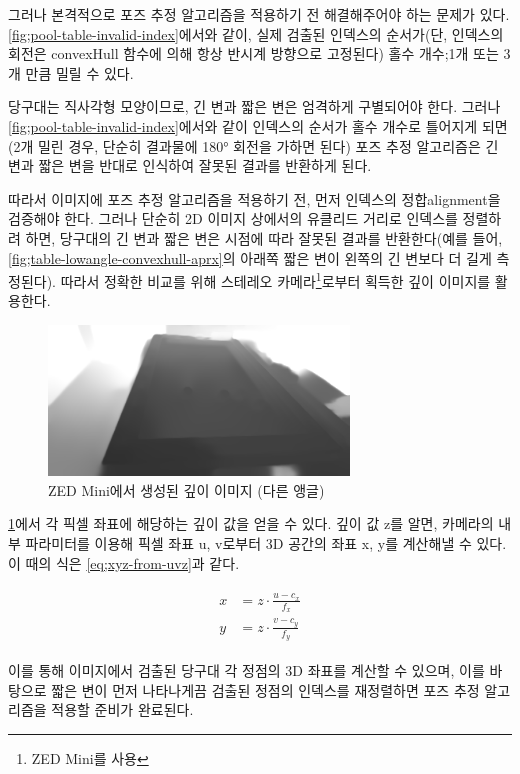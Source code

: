 \documentclass[10pt]{oblivoir}
\newcommand{\textss}[1]{\scriptsize#1\normalsize}
\begin{document}
그러나 본격적으로 포즈 추정 알고리즘을 적용하기 전 해결해주어야 하는 문제가 있다. \cref{fig;pool-table-invalid-index}에서와 같이, 실제 검출된 인덱스의 순서가(단, 인덱스의 회전은 convexHull 함수에 의해 항상 반시계 방향으로 고정된다) 홀수 개수;1개 또는 3개 만큼 밀릴 수 있다. 

당구대는 직사각형 모양이므로, 긴 변과 짧은 변은 엄격하게 구별되어야 한다. 그러나 \cref{fig;pool-table-invalid-index}에서와 같이 인덱스의 순서가 홀수 개수로 틀어지게 되면(2개 밀린 경우, 단순히 결과물에 180\si{\degree} 회전을 가하면 된다) 포즈 추정 알고리즘은 긴 변과 짧은 변을 반대로 인식하여 잘못된 결과를 반환하게 된다.

따라서 이미지에 포즈 추정 알고리즘을 적용하기 전, 먼저 인덱스의 정합\textss{alignment}을 검증해야 한다. 그러나 단순히 2D 이미지 상에서의 유클리드 거리로 인덱스를 정렬하려 하면, 당구대의 긴 변과 짧은 변은 시점에 따라 잘못된 결과를 반환한다(예를 들어, \cref{fig;table-lowangle-convexhull-aprx}의 아래쪽 짧은 변이 왼쪽의 긴 변보다 더 길게 측정된다). 따라서 정확한 비교를 위해 스테레오 카메라\footnote{ZED Mini를 사용}로부터 획득한 깊이 이미지를 활용한다.

\begin{figure}[ht]
    \centering
    \includegraphics[width=8cm]{img/table-depth.png}
    \caption{ZED Mini에서 생성된 깊이 이미지 (다른 앵글)}
    \label{fig;table-depth-image}
\end{figure}

\cref{fig;table-depth-image}에서 각 픽셀 좌표에 해당하는 깊이 값을 얻을 수 있다. 깊이 값 z를 알면, 카메라의 내부 파라미터를 이용해 픽셀 좌표 u, v로부터 3D 공간의 좌표 x, y를 계산해낼 수 있다. 이 때의 식은 \cref{eq;xyz-from-uvz}과 같다.

\begin{align} 
    \begin{split}
        x &= z\cdot\frac{u-c_x}{f_x} \\
        y &= z\cdot\frac{v-c_y}{f_y} 
    \end{split}
    \label{eq;xyz-from-uvz}
\end{align}

이를 통해 이미지에서 검출된 당구대 각 정점의 3D 좌표를 계산할 수 있으며, 이를 바탕으로 짧은 변이 먼저 나타나게끔 검출된 정점의 인덱스를 재정렬하면 포즈 추정 알고리즘을 적용할 준비가 완료된다.
\end{document}
